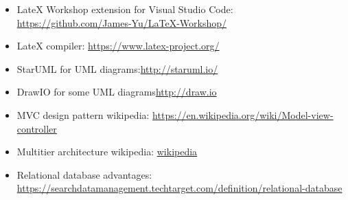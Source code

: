 \begin{itemize}
    \item LateX Workshop extension for Visual Studio Code: \newline\href{https://github.com/James-Yu/LaTeX-Workshop/}{https://github.com/James-Yu/LaTeX-Workshop/}
    \item LateX compiler: \newline\href{https://www.latex-project.org/}{https://www.latex-project.org/}
    \item StarUML for UML diagrams:\newline\href{http://staruml.io/}{http://staruml.io/}
    \item DrawIO for some UML diagrams\newline\href{http://draw.io}{http://draw.io}
    \item MVC design pattern wikipedia: \newline\href{https://en.wikipedia.org/wiki/Model-view-controller}{https://en.wikipedia.org/wiki/Model-view-controller}
    \item Multitier architecture wikipedia: \newline\href{https://en.wikipedia.org/wiki/Multitier_architecture}{wikipedia}
    \item Relational database advantages: \newline\href{https://searchdatamanagement.techtarget.com/definition/relational-database}{https://searchdatamanagement.techtarget.com/definition/relational-database}
\end{itemize}